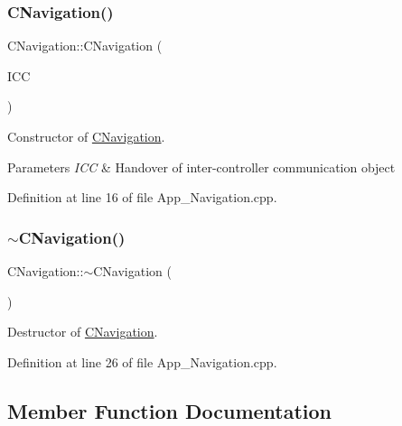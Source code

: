 \subsubsection{\texorpdfstring{CNavigation()}{CNavigation()}}
{\footnotesize\ttfamily C\+Navigation\+::\+C\+Navigation (\begin{DoxyParamCaption}\item[{\mbox{\hyperlink{class_c_i_c_c_comms}{C\+I\+C\+C\+Comms}} \&}]{I\+CC }\end{DoxyParamCaption})}



Constructor of \mbox{\hyperlink{class_c_navigation}{C\+Navigation}}. 


\begin{DoxyParams}{Parameters}
{\em I\+CC} & Handover of inter-\/controller communication object \\
\hline
\end{DoxyParams}


Definition at line 16 of file App\+\_\+\+Navigation.\+cpp.

\mbox{\label{class_c_navigation_ae4c7c3e27ded45a94bc268634a7739da}} 
\subsubsection{\texorpdfstring{$\sim$CNavigation()}{~CNavigation()}}
{\footnotesize\ttfamily C\+Navigation\+::$\sim$\+C\+Navigation (\begin{DoxyParamCaption}{ }\end{DoxyParamCaption})}



Destructor of \mbox{\hyperlink{class_c_navigation}{C\+Navigation}}. 



Definition at line 26 of file App\+\_\+\+Navigation.\+cpp.



\subsection{Member Function Documentation}
\mbox{\label{class_c_navigation_abc7e30f72ee2cb33be7b0949efe1cb18}} 
